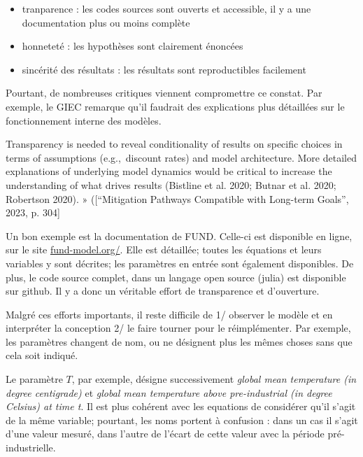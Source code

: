 \begin{itemize}
    \item tranparence : les codes sources sont ouverts et accessible, il y a une documentation plus ou moins complète
    \item honneteté : les hypothèses sont clairement énoncées
    \item sincérité des résultats : les résultats sont reproductibles facilement
\end{itemize}

Pourtant, de nombreuses critiques viennent compromettre ce constat. Par exemple, le GIEC remarque qu'il faudrait des explications plus détaillées sur le fonctionnement interne des modèles. 


\begin{displayquote}
Transparency is needed to reveal conditionality of results on specific choices in terms of assumptions (e.g., discount rates) and model architecture. More detailed explanations of underlying model dynamics would be critical to increase the understanding of what drives results (Bistline et al. 2020; Butnar et al. 2020; Robertson 2020). » ([“Mitigation Pathways Compatible with Long-term Goals”, 2023, p. 304]
\end{displayquote}


Un bon exemple est la documentation de FUND. Celle-ci est disponible en ligne, sur le site \href{http://www.fund-model.org/}{fund-model.org/}. Elle est détaillée; toutes les équations et leurs variables y sont décrites; les paramètres en entrée sont également disponibles. De plus, le code source complet, dans un langage open source (julia) est disponible sur github. Il y a donc un véritable effort de transparence et d'ouverture. 

Malgré ces efforts importants, il reste difficile de 1/ observer le modèle et en interpréter la conception 2/ le faire tourner pour le réimplémenter.  Par exemple, les paramètres changent de nom, ou ne désignent plus les mêmes choses sans que cela soit indiqué.

Le paramètre $T$, par exemple, désigne successivement \emph{ global mean temperature (in degree centigrade)} et \emph{global mean temperature above pre-industrial (in degree Celsius) at time t}. Il est plus cohérent avec les equations de considérer qu'il s'agit de la même variable; pourtant, les noms portent à confusion : dans un cas il s'agit d'une valeur mesuré, dans l'autre de l'écart de cette valeur avec la période pré-industrielle. 

